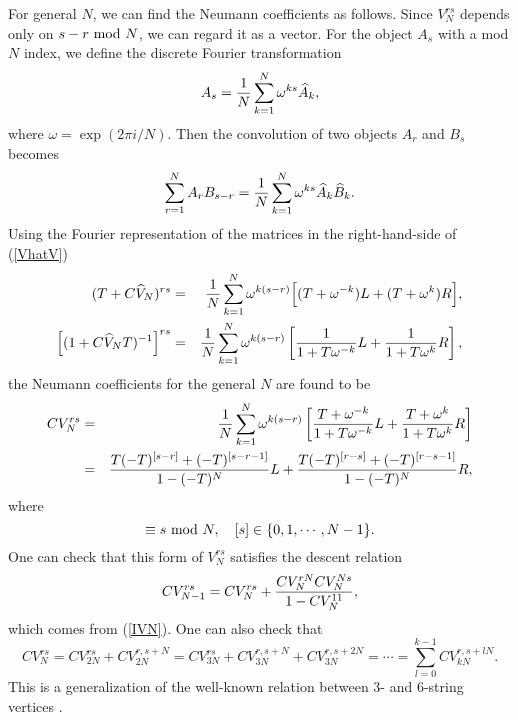 \documentclass[a4paper,12pt]{article}
\def\o{\over}
\def\lf{\left}
\def\ri{\right}
\def\h#1{\widehat{#1}}
\def\om{\omega}
\newcommand{\nn}{\nonumber \\}
\begin{document}
For general $N$, we can find 
the Neumann coefficients as follows.
Since $V_N^{rs}$ depends only on $s-r~{\rm mod}~N$,
we can regard it as a vector.
For the object $A_s$ with a mod $N$ index,
we define the discrete Fourier transformation
\begin{equation}
A_s={1\o N}\sum_{k=1}^N\om^{ks}\h{A}_k ,
\end{equation}
where $\om=\exp(2\pi i/N)$.
Then the convolution of two objects $A_r$ and $B_s$ becomes
\begin{equation}
\sum_{r=1}^{N}A_rB_{s-r}={1\o N}\sum_{k=1}^N\om^{ks}\h{A}_k\h{B}_k.
\end{equation}
Using the Fourier representation of the matrices in the right-hand-side of
(\ref{VhatV})
\begin{eqnarray}
 (T+C\h{V}_N)^{rs}&=&{1\o N}\sum_{k=1}^N\om^{k(s-r)}
\Big[(T+\om^{-k})L+(T+\om^k)R\Big], \\
\Big[(1+C\h{V}_NT)^{-1}\Big]^{rs}&=&{1\o N}\sum_{k=1}^N\om^{k(s-r)}
\lf[{1\o 1+T\om^{-k}}L+{1\o 1+T\om^{k}}R\ri],
\end{eqnarray}
the Neumann coefficients for the general $N$ are found to be
\begin{eqnarray}
CV_N^{rs}&=&{1\o N}\sum_{k=1}^N\om^{k(s-r)}
\lf[{T+\om^{-k}\o 1+T\om^{-k}}L+
{T+\om^k\o 1+T\om^k}R\ri] \nn
&=&{T(-T)^{[s-r]}+(-T)^{[s-r-1]}\o 1-(-T)^N}L
+{T(-T)^{[r-s]}+(-T)^{[r-s-1]}\o 1-(-T)^N}R,
\label{VNclose}
\end{eqnarray}
where  
\begin{equation}
[s]\equiv s~{\rm mod}~N,\quad [s]\in\{0,1,\cdots, N-1\}. 
\end{equation}
One can check that this form of $V^{rs}_N$ satisfies the descent relation
\begin{equation}
CV_{N-1}^{rs}=CV_N^{rs}+{CV^{rN}_NCV_N^{Ns}\o 1-CV_N^{11}},
\end{equation}
which comes from (\ref{IVN}).
One can also check that
\begin{equation}
 CV_N^{rs}=CV_{2N}^{rs}+CV_{2N}^{r,s+N}
=CV_{3N}^{rs}+CV_{3N}^{r,s+N}+CV_{3N}^{r,s+2N}
=\cdots=\sum_{l=0}^{k-1}CV_{kN}^{r,s+lN}.
\end{equation}
This is a generalization of the well-known relation between
3- and 6-string vertices \cite{GrossJevicki}.
\end{document}
